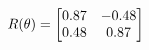 \documentclass[preview]{standalone}
\begin{document}
\begin{align*}
\special{dvisvgm:raw <g id='unique000'>}R(\theta) = \begin{bmatrix}0.87 & -0.48\\0.48 & 0.87\end{bmatrix}\special{dvisvgm:raw </g>}
\end{align*}
\end{document}
